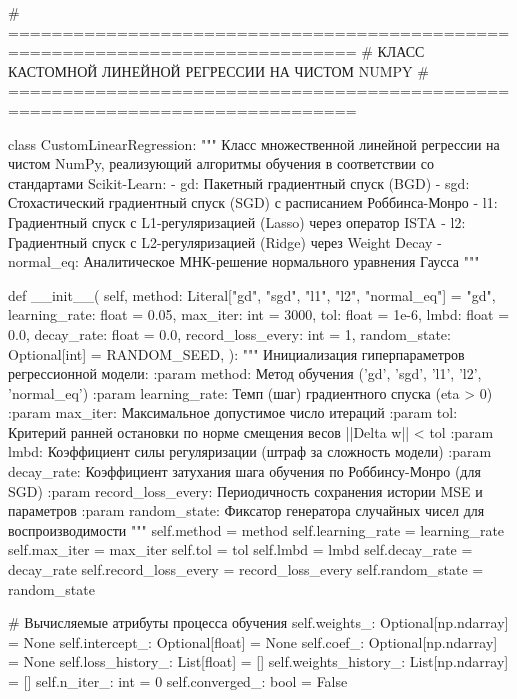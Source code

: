 \documentclass[14pt,a4paper]{extarticle}
\begin{document}
\begin{CodeListing}
# ==============================================================================
# КЛАСС КАСТОМНОЙ ЛИНЕЙНОЙ РЕГРЕССИИ НА ЧИСТОМ NUMPY
# ==============================================================================

class CustomLinearRegression:
    """
    Класс множественной линейной регрессии на чистом NumPy,
    реализующий алгоритмы обучения в соответствии со стандартами Scikit-Learn:
    - gd: Пакетный градиентный спуск (BGD)
    - sgd: Стохастический градиентный спуск (SGD) с расписанием Роббинса-Монро
    - l1: Градиентный спуск с L1-регуляризацией (Lasso) через оператор ISTA
    - l2: Градиентный спуск с L2-регуляризацией (Ridge) через Weight Decay
    - normal_eq: Аналитическое МНК-решение нормального уравнения Гаусса
    """

    def __init__(
        self,
        method: Literal["gd", "sgd", "l1", "l2", "normal_eq"] = "gd",
        learning_rate: float = 0.05,
        max_iter: int = 3000,
        tol: float = 1e-6,
        lmbd: float = 0.0,
        decay_rate: float = 0.0,
        record_loss_every: int = 1,
        random_state: Optional[int] = RANDOM_SEED,
    ):
        """
        Инициализация гиперпараметров регрессионной модели:
        :param method: Метод обучения ('gd', 'sgd', 'l1', 'l2', 'normal_eq')
        :param learning_rate: Темп (шаг) градиентного спуска (eta > 0)
        :param max_iter: Максимальное допустимое число итераций
        :param tol: Критерий ранней остановки по норме смещения весов ||Delta w|| < tol
        :param lmbd: Коэффициент силы регуляризации (штраф за сложность модели)
        :param decay_rate: Коэффициент затухания шага обучения по Роббинсу-Монро (для SGD)
        :param record_loss_every: Периодичность сохранения истории MSE и параметров
        :param random_state: Фиксатор генератора случайных чисел для воспроизводимости
        """
        self.method = method
        self.learning_rate = learning_rate
        self.max_iter = max_iter
        self.tol = tol
        self.lmbd = lmbd
        self.decay_rate = decay_rate
        self.record_loss_every = record_loss_every
        self.random_state = random_state

        # Вычисляемые атрибуты процесса обучения
        self.weights_: Optional[np.ndarray] = None
        self.intercept_: Optional[float] = None
        self.coef_: Optional[np.ndarray] = None
        self.loss_history_: List[float] = []
        self.weights_history_: List[np.ndarray] = []
        self.n_iter_: int = 0
        self.converged_: bool = False


\end{CodeListing}
\end{document}
